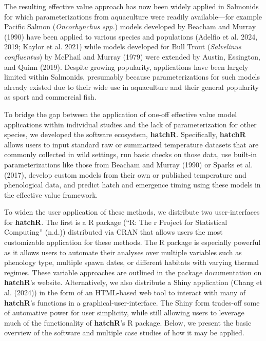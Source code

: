 \documentclass[webpdf,large,contemporary,namedate]{oup-authoring-template}
\theoremstyle{thmstyleone}
\theoremstyle{thmstyletwo}
\theoremstyle{thmstylethree}
\begin{document}
The resulting effective value approach has now been widely applied in
Salmonids for which parameterizations from aquaculture were readily
available---for example Pacific Salmon (\emph{Oncorhynchus spp.}) models
developed by Beacham and Murray (1990) have been applied to various
species and populations (Adelfio et al. 2024, 2019; Kaylor et al. 2021)
while models developed for Bull Trout (\emph{Salvelinus confluentus}) by
McPhail and Murray (1979) were extended by Austin, Essington, and Quinn
(2019). Despite growing popularity, applications have been largely
limited within Salmonids, presumably because parameterizations for such
models already existed due to their wide use in aquaculture and their
general popularity as sport and commercial fish.

To bridge the gap between the application of one-off effective value
model applications within individual studies and the lack of
parameterization for other species, we developed the software ecosystem,
\textbf{hatchR}. Specifically, \textbf{hatchR} allows users to input
standard raw or summarized temperature datasets that are commonly
collected in wild settings, run basic checks on those data, use built-in
parameterizations like those from Beacham and Murray (1990) or Sparks et
al. (2017), develop custom models from their own or published
temperature and phenological data, and predict hatch and emergence
timing using these models in the effective value framework.

To widen the user application of these methods, we distribute two
user-interfaces for \textbf{hatchR}. The first is a R package ({``R: The
r Project for Statistical Computing''} (n.d.)) distributed via CRAN that
allows users the most customizable application for these methods. The R
package is especially powerful as it allows users to automate their
analyses over multiple variables such as phenology type, multiple spawn
dates, or different habitats with varying thermal regimes. These
variable approaches are outlined in the package documentation on
\textbf{hatchR}'s website. Alternatively, we also distribute a Shiny
application (Chang et al. (2024)) in the form of an HTML-based web tool
to interact with many of \textbf{hatchR}'s functions in a
graphical-user-interface. The Shiny form trades-off some of automative
power for user simplicity, while still allowing users to leverage much
of the functionality of \textbf{hatchR}'s R package. Below, we present
the basic overview of the software and multiple case studies of how it
may be applied.
\end{document}
